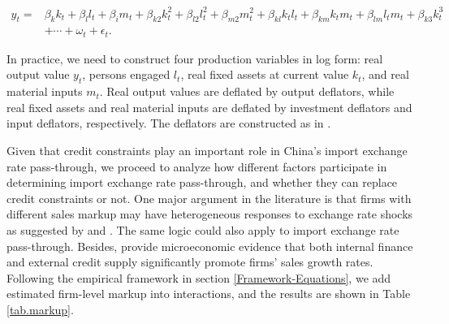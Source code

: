 \documentclass[12pt]{article}
\begin{document}
$$
\begin{aligned}
	y_{t}= &\beta_{k} k_{t}+\beta_{l} l_{t}+\beta_{i} m_{t}+\beta_{k 2} k_{t}^{2}+\beta_{l 2} l_{t}^{2}+\beta_{m 2} m_{t}^{2}+\beta_{k l} k_{ t} l_{t}+\beta_{k m} k_{t} m_{t}+\beta_{l m} l_{t} m_{t}+\beta_{k 3} k_{t}^{3}\\
	&+\cdots+\omega_{t}+\epsilon_{t}.
\end{aligned}
$$

In practice, we need to construct four production variables in log form: real output value $y_t$, persons engaged $l_t$, real fixed assets at current value $k_t$, and real material inputs $m_t$. Real output values are deflated by output deflators, while real fixed assets and real material inputs are deflated by investment deflators and input deflators, respectively. The deflators are constructed as in \cite{brandt2012}.

Given that credit constraints play an important role in China's import exchange rate pass-through, we proceed to analyze how different factors participate in determining import exchange rate pass-through, and whether they can replace credit constraints or not. One major argument in the literature is that firms with different sales markup may have heterogeneous responses to exchange rate shocks as suggested by \cite{bmm2012} and \cite{lmx2015}. The same logic could also apply to import exchange rate pass-through. Besides, \cite{llz2018} provide microeconomic evidence that both internal finance and external credit supply significantly promote firms' sales growth rates. Following the empirical framework in section \ref{Framework-Equations}, we add estimated firm-level markup into interactions, and the results are shown in Table \ref{tab.markup}.
\end{document}
